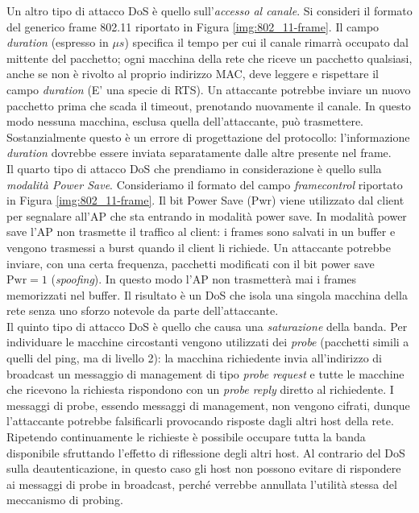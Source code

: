 Un altro tipo di attacco DoS è quello sull'\textit{accesso al canale}. Si consideri il formato del generico frame 802.11 riportato in Figura \ref{img:802_11-frame}. Il campo \textit{duration} (espresso in $\mu s$) specifica il tempo per cui il canale rimarrà occupato dal mittente del pacchetto; ogni macchina della rete che riceve un pacchetto qualsiasi, anche se non è rivolto al proprio indirizzo MAC, deve leggere e rispettare il campo \textit{duration} (E' una specie di RTS). Un attaccante potrebbe inviare un nuovo pacchetto prima che scada il timeout, prenotando nuovamente il canale. In questo modo nessuna macchina, esclusa quella dell'attaccante, può trasmettere. Sostanzialmente questo è un errore di progettazione del protocollo: l'informazione \textit{duration} dovrebbe essere inviata separatamente dalle altre presente nel frame.\\

Il quarto tipo di attacco DoS che prendiamo in considerazione è quello sulla \textit{modalità Power Save}. Consideriamo il formato del campo \textit{framecontrol} riportato in Figura \ref{img:802_11-frame}. Il bit Power Save (Pwr) viene utilizzato dal client per segnalare all'AP che sta entrando in modalità power save. In modalità power save l'AP non trasmette il traffico al client: i frames sono salvati in un buffer e vengono trasmessi a burst quando il client li richiede. Un attaccante potrebbe inviare, con una certa frequenza, pacchetti modificati con il bit power save $\text{Pwr} = 1$ (\textit{spoofing}). In questo modo l'AP non trasmetterà mai i frames memorizzati nel buffer. Il risultato è un DoS che isola una singola macchina della rete senza uno sforzo notevole da parte dell'attaccante.\\

Il quinto tipo di attacco DoS è quello che causa una \textit{saturazione} della banda. Per individuare le macchine circostanti vengono utilizzati dei \textit{probe} (pacchetti simili a quelli del ping, ma di livello 2): la macchina richiedente invia all'indirizzo di broadcast un messaggio di management di tipo \textit{probe request} e tutte le macchine che ricevono la richiesta rispondono con un \textit{probe reply} diretto al richiedente. I messaggi di probe, essendo messaggi di management, non vengono cifrati, dunque l'attaccante potrebbe falsificarli provocando risposte dagli altri host della rete. Ripetendo continuamente le richieste è possibile occupare tutta la banda disponibile sfruttando l'effetto di riflessione degli altri host. Al contrario del DoS sulla deautenticazione, in questo caso gli host non possono evitare di rispondere ai messaggi di probe in broadcast, perché verrebbe annullata l'utilità stessa del meccanismo di probing.\\

